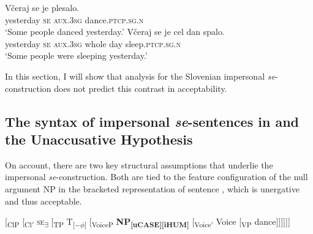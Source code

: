 \documentclass[output=paper,
modfonts,nonflat,
newtxmath
]{langsci/langscibook}
\begin{document}
\begin{exe}
\ex \begin{xlist} \label{ex:lenardic: 12}
\ex \label{ex:lenardic: 12a} \gll Včeraj se je plesalo.\\
yesterday \textsc{se} \textsc{aux}.\textsc{3sg} dance.\textsc{ptcp.sg.n}\\
\trans `Some people danced yesterday.'
\ex \gll Včeraj se je cel dan spalo.\\
yesterday \textsc{se} \textsc{aux}.\textsc{3sg} whole day sleep.\textsc{ptcp.sg.n}\\
\trans `Some people were sleeping yesterday.'
\end {xlist}
\ex \label{ex:lenardic: 13}
\begin{xlist} 
 \label{VcUm}
\end{xlist}
\end{exe} \par

\noindent In this section, I will show that  analysis for the Slovenian impersonal \textit{se}-construction does not predict this contrast in acceptability.

\subsection{The syntax of impersonal \textit{se}-sentences in \citet{riverosheppard2003} and the Unaccusative Hypothesis} \label{sec3.2}
On  account, there are two key structural assumptions that underlie the impersonal \textit{se}-construction. Both are tied to the feature configuration of the null argument NP in the  bracketed representation  of sentence , which is unergative and thus acceptable.

\begin{exe} 
\ex \label{ex:lenardic: 14} {[\textsubscript{ClP} [\textsubscript{Cl$'$} \textsc{se}\textsubscript{\textbf{$\exists$}} [\textsubscript{TP} T\textsubscript{[$-\phi$]} [\textsubscript{VoiceP} \textbf{NP}\textsubscript{\textbf{[uCASE][iHUM]}} [\textsubscript{Voice$'$} Voice [\textsubscript{VP} dance]]]]]]}
\end{exe} \par
\end{document}
